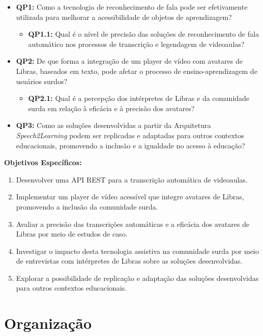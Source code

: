 \begin{itemize}
\item \textbf{QP1:} Como a tecnologia de reconhecimento de fala pode ser efetivamente utilizada para melhorar a acessibilidade de objetos de aprendizagem?
\begin{itemize}
\item \textbf{QP1.1:} Qual é o nível de precisão das soluções de reconhecimento de fala automático nos processos de transcrição e legendagem de videoaulas?
\end{itemize}
\item \textbf{QP2:} De que forma a integração de um player de vídeo com avatares de Libras, baseados em texto, pode afetar o processo de ensino-aprendizagem de usuários surdos?
\begin{itemize}
\item \textbf{QP2.1:} Qual é a percepção dos intérpretes de Libras e da comunidade surda em relação à eficácia e à precisão dos avatares?
\end{itemize}
\item \textbf{QP3:} Como as soluções desenvolvidas a partir da Arquitetura \textit{Speech2Learning} podem ser replicadas e adaptadas para outros contextos educacionais, promovendo a inclusão e a igualdade no acesso à educação?
\end{itemize}

\textbf{Objetivos Específicos:}

\begin{enumerate}
\item Desenvolver uma API REST para a transcrição automática de videoaulas.
\item Implementar um player de vídeo acessível que integre avatares de Libras, promovendo a inclusão da comunidade surda.
\item Avaliar a precisão das transcrições automáticas e a eficácia dos avatares de Libras por meio de estudos de caso.
\item Investigar o impacto desta tecnologia assistiva na comunidade surda por meio de entrevistas com intérpretes de Libras sobre as soluções desenvolvidas.
\item Explorar a possibilidade de replicação e adaptação das soluções desenvolvidas para outros contextos educacionais.
\end{enumerate}

\section{Organização}

